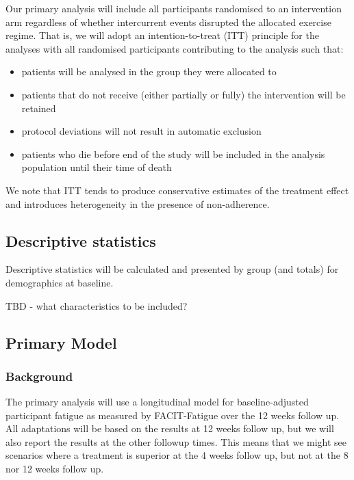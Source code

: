 \documentclass[
]{article}
\providecommand{\tightlist}{%
  \setlength{\itemsep}{0pt}\setlength{\parskip}{0pt}}
\begin{document}
Our primary analysis will include all participants randomised to an intervention arm regardless of whether intercurrent events disrupted the allocated exercise regime.
That is, we will adopt an intention-to-treat (ITT) principle for the analyses with all randomised participants contributing to the analysis such that:

\begin{itemize}
\tightlist
\item
  patients will be analysed in the group they were allocated to
\item
  patients that do not receive (either partially or fully) the intervention will be retained
\item
  protocol deviations will not result in automatic exclusion
\item
  patients who die before end of the study  will be included in the analysis population until their time of death
\end{itemize}

We note that ITT tends to produce conservative estimates of the treatment effect and introduces heterogeneity in the presence of non-adherence.

\hypertarget{descriptive-statistics}{%
\subsection{Descriptive statistics}\label{descriptive-statistics}}

Descriptive statistics will be calculated and presented by group (and totals) for demographics at baseline.

TBD - what characteristics to be included?

\hypertarget{primary-model}{%
\subsection{Primary Model}\label{primary-model}}

\hypertarget{background}{%
\subsubsection{Background}\label{background}}

The primary analysis will use a longitudinal model for baseline-adjusted participant fatigue as measured by FACIT-Fatigue over the 12 weeks follow up.
All adaptations will be based on the results at 12 weeks follow up, but we will also report the results at the other followup times.
This means that we might see scenarios where a treatment is superior at the 4 weeks follow up, but not at the 8 nor 12 weeks follow up.
\end{document}
